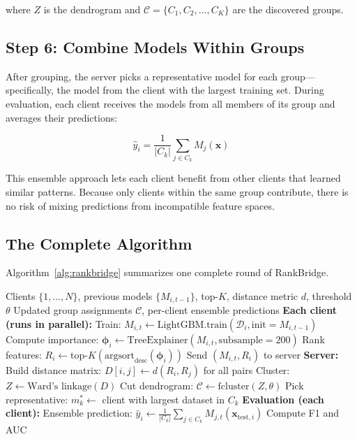 \documentclass[information,article,submit,pdftex]{mdpi}
\begin{document}
where $Z$ is the dendrogram and $\mathcal{C} = \{C_1, C_2, \ldots, C_K\}$ are
the discovered groups.

\subsection{Step 6: Combine Models Within Groups}

After grouping, the server picks a representative model for each group---
specifically, the model from the client with the largest training set. During
evaluation, each client receives the models from all members of its group and
averages their predictions:

\begin{equation}\label{eq:ensemble}
  \hat{y}_i = \frac{1}{|C_k|} \sum_{j \in C_k} M_j(\mathbf{x})
\end{equation}

This ensemble approach lets each client benefit from other clients that learned
similar patterns. Because only clients within the same group contribute, there is
no risk of mixing predictions from incompatible feature spaces.

\subsection{The Complete Algorithm}

Algorithm~\ref{alg:rankbridge} summarizes one complete round of RankBridge.

\begin{algorithm}[H]
\caption{RankBridge: One Federated Round}\label{alg:rankbridge}
\begin{algorithmic}[1]
\REQUIRE Clients $\{1, \ldots, N\}$, previous models $\{M_{i,t-1}\}$,
  top-$K$, distance metric $d$, threshold $\theta$
\ENSURE Updated group assignments $\mathcal{C}$, per-client ensemble predictions
\STATE \textbf{Each client (runs in parallel):}
  \STATE Train: $M_{i,t} \leftarrow \text{LightGBM.train}(\mathcal{D}_i,
    \text{init} = M_{i,t-1})$
  \STATE Compute importance: $\boldsymbol{\phi}_i \leftarrow
    \text{TreeExplainer}(M_{i,t}, \text{subsample}=200)$
  \STATE Rank features: $R_i \leftarrow
    \text{top-}K(\text{argsort}_\text{desc}(\boldsymbol{\phi}_i))$
  \STATE Send $(M_{i,t}, R_i)$ to server
\ENDFOR
\STATE \textbf{Server:}
\STATE Build distance matrix: $D[i,j] \leftarrow d(R_i, R_j)$ for all pairs
\STATE Cluster: $Z \leftarrow \text{Ward's linkage}(D)$
\STATE Cut dendrogram: $\mathcal{C} \leftarrow \text{fcluster}(Z, \theta)$
  \STATE Pick representative: $m_k^* \leftarrow$ client with largest dataset
    in $C_k$
\ENDFOR
\STATE \textbf{Evaluation (each client):}
  \STATE Ensemble prediction:
    $\hat{y}_i \leftarrow \frac{1}{|C_k|} \sum_{j \in C_k}
    M_{j,t}(\mathbf{x}_{\text{test},i})$
  \STATE Compute F1 and AUC
\ENDFOR
\end{algorithmic}
\end{algorithm}
\end{document}
